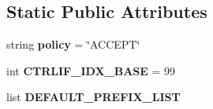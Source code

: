 \subsection*{Static Public Attributes}
\begin{DoxyCompactItemize}
\item 
\hypertarget{classcore_1_1netns_1_1nodes_1_1_ctrl_net_aeb683af1f2bbdcf0feed501390ec16ef}{string {\bfseries policy} = \char`\"{}A\+C\+C\+E\+P\+T\char`\"{}}\label{classcore_1_1netns_1_1nodes_1_1_ctrl_net_aeb683af1f2bbdcf0feed501390ec16ef}

\item 
\hypertarget{classcore_1_1netns_1_1nodes_1_1_ctrl_net_a176032df7f9b0c8f8b64c9a821149bde}{int {\bfseries C\+T\+R\+L\+I\+F\+\_\+\+I\+D\+X\+\_\+\+B\+A\+S\+E} = 99}\label{classcore_1_1netns_1_1nodes_1_1_ctrl_net_a176032df7f9b0c8f8b64c9a821149bde}

\item 
list {\bfseries D\+E\+F\+A\+U\+L\+T\+\_\+\+P\+R\+E\+F\+I\+X\+\_\+\+L\+I\+S\+T}
\end{DoxyCompactItemize}


